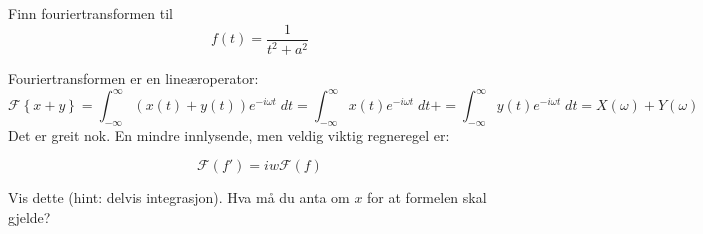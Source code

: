 \begin{oppgave}{5}
Finn fouriertransformen til
\[
f(t)=\frac{1}{t^2+a^2}
\]
\end{oppgave}


Fouriertransformen er en lineæroperator: 
\[
\mathcal{F}\left\{ x+y \right\}=\int_{-\infty}^{\infty} \left(x(t)+y(t)\right)e^{-i\omega t}\;dt=\int_{-\infty}^{\infty} x(t)e^{-i\omega t}\;dt+=\int_{-\infty}^{\infty} y(t)e^{-i\omega t}\;dt=X(\omega) +Y(\omega) 
\]
Det er greit nok. 
En mindre innlysende, 
men veldig viktig regneregel er:

\begin{tcolorbox}
\[
\mathcal{F}(f')=iw\mathcal{F}(f)
\]
\end{tcolorbox}

\begin{oppgave}{6}
Vis dette (hint: delvis integrasjon). Hva må du anta om $x$ for at formelen skal gjelde? 
\end{oppgave}

%




